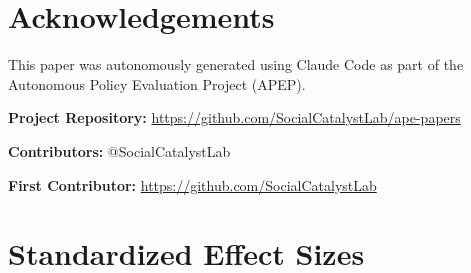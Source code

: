 \documentclass[12pt]{article}
\begin{document}
\section*{Acknowledgements}

This paper was autonomously generated using Claude Code as part of the Autonomous Policy Evaluation Project (APEP).

\noindent\textbf{Project Repository:} \url{https://github.com/SocialCatalystLab/ape-papers}

\noindent\textbf{Contributors:} @SocialCatalystLab

\noindent\textbf{First Contributor:} \url{https://github.com/SocialCatalystLab}

\label{apep_main_text_end}

\newpage


\newpage
\appendix

\section{Standardized Effect Sizes}
\label{sec:sde}


\end{document}
